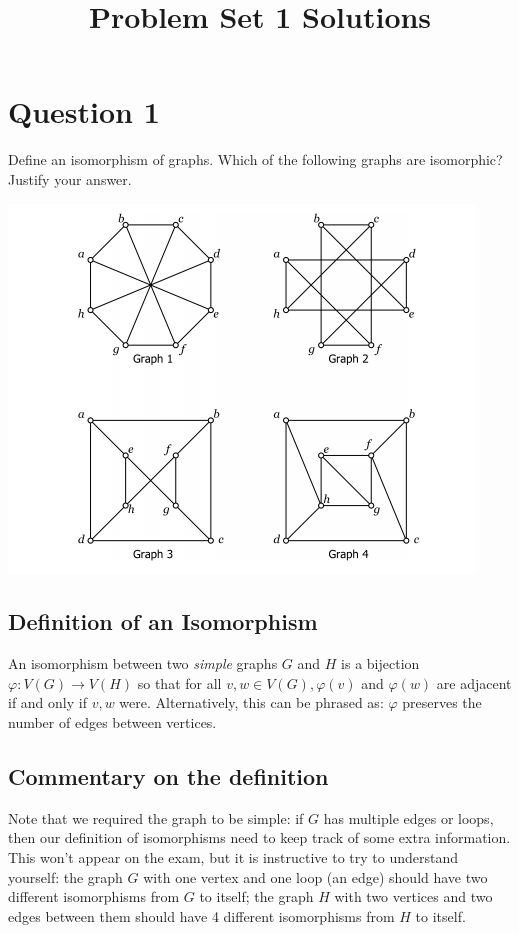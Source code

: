 \documentclass{amsart}
\title{Problem Set 1 Solutions}
\begin{document}
\maketitle

\section*{Question 1}

Define an isomorphism of graphs.  Which of the following graphs are isomorphic?  Justify your answer.  

  \includegraphics[width=.9\textwidth]{FourGraphs.png}

\subsection*{Definition of an Isomorphism}

    An isomorphism between two \emph{simple} graphs $G$ and $H$ is a bijection $\varphi:V(G)\to V(H)$ so that for all $v, w\in V(G), \varphi(v)$ and $\varphi(w)$ are adjacent if and only if $v, w$ were.  Alternatively, this can be phrased as: $\varphi$ preserves the number of edges between vertices.

\subsection*{Commentary on the definition}    
    Note that we required the graph to be simple: if $G$ has multiple edges or loops, then our definition of isomorphisms need to keep track of some extra information.  This won't appear on the exam, but it is instructive to try to understand yourself: the graph $G$ with one vertex and one loop (an edge) should have two different isomorphisms from $G$ to itself; the graph $H$ with two vertices and two edges between them should have 4 different isomorphisms from $H$ to itself.
\end{document}
